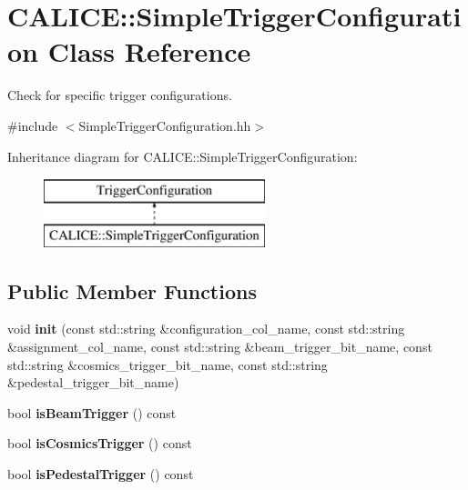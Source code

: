\section{C\-A\-L\-I\-C\-E\-:\-:Simple\-Trigger\-Configuration Class Reference}
\label{classCALICE_1_1SimpleTriggerConfiguration}


Check for specific trigger configurations.  




{\ttfamily \#include $<$Simple\-Trigger\-Configuration.\-hh$>$}

Inheritance diagram for C\-A\-L\-I\-C\-E\-:\-:Simple\-Trigger\-Configuration\-:\begin{figure}[H]
\begin{center}
\leavevmode
\includegraphics[height=2.000000cm]{classCALICE_1_1SimpleTriggerConfiguration}
\end{center}
\end{figure}
\subsection*{Public Member Functions}
\begin{DoxyCompactItemize}
\item 
void {\bfseries init} (const std\-::string \&configuration\-\_\-col\-\_\-name, const std\-::string \&assignment\-\_\-col\-\_\-name, const std\-::string \&beam\-\_\-trigger\-\_\-bit\-\_\-name, const std\-::string \&cosmics\-\_\-trigger\-\_\-bit\-\_\-name, const std\-::string \&pedestal\-\_\-trigger\-\_\-bit\-\_\-name)\label{classCALICE_1_1SimpleTriggerConfiguration_af32ebbee6e51c79b3f14951597e08f13}

\item 
bool {\bfseries is\-Beam\-Trigger} () const \label{classCALICE_1_1SimpleTriggerConfiguration_ab6484d9f89f6462031a28df474a1a286}

\item 
bool {\bfseries is\-Cosmics\-Trigger} () const \label{classCALICE_1_1SimpleTriggerConfiguration_a8330e23aa2777662313198f2a380294d}

\item 
bool {\bfseries is\-Pedestal\-Trigger} () const \label{classCALICE_1_1SimpleTriggerConfiguration_ac2abe0709c380808d3c16b7fb2c79c05}

\end{DoxyCompactItemize}
